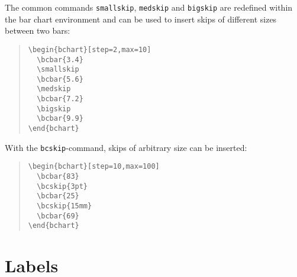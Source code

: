 \documentclass{article}
\begin{document}
The common commands \texttt{smallskip}, \texttt{medskip} and \texttt{bigskip} are redefined within the bar chart environment and can be used to insert skips of different sizes between two bars:
\begin{quote}\small
\begin{verbatim}
\begin{bchart}[step=2,max=10]
  \bcbar{3.4}
  \smallskip
  \bcbar{5.6}
  \medskip
  \bcbar{7.2}
  \bigskip
  \bcbar{9.9}
\end{bchart}
\end{verbatim}
\end{quote}
\begin{quote}
\begin{bchart}[step=2,max=10]
  \smallskip
  \medskip
  \bigskip
\end{bchart}
\end{quote}
With the \texttt{bcskip}-command, skips of arbitrary size can be inserted:
\begin{quote}\small
\begin{verbatim}
\begin{bchart}[step=10,max=100]
  \bcbar{83}
  \bcskip{3pt}
  \bcbar{25}
  \bcskip{15mm}
  \bcbar{69}
\end{bchart}
\end{verbatim}
\end{quote}
\begin{quote}
\begin{bchart}[step=10,max=100]
  \bcskip{3pt}
  \bcskip{15mm}
\end{bchart}
\end{quote}


\section{Labels}
\end{document}
